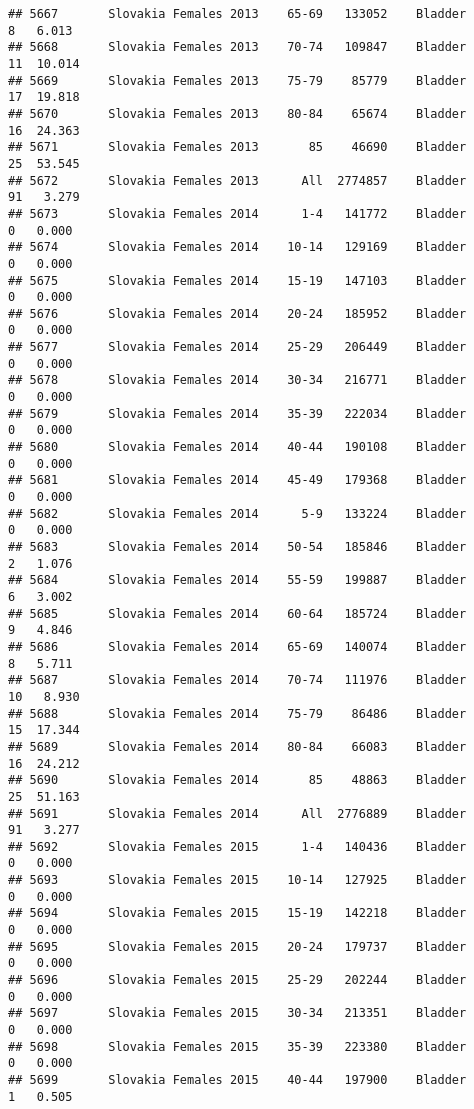 \documentclass[
]{article}
\begin{document}
\begin{verbatim}
## 5667       Slovakia Females 2013    65-69   133052    Bladder      8   6.013
## 5668       Slovakia Females 2013    70-74   109847    Bladder     11  10.014
## 5669       Slovakia Females 2013    75-79    85779    Bladder     17  19.818
## 5670       Slovakia Females 2013    80-84    65674    Bladder     16  24.363
## 5671       Slovakia Females 2013       85    46690    Bladder     25  53.545
## 5672       Slovakia Females 2013      All  2774857    Bladder     91   3.279
## 5673       Slovakia Females 2014      1-4   141772    Bladder      0   0.000
## 5674       Slovakia Females 2014    10-14   129169    Bladder      0   0.000
## 5675       Slovakia Females 2014    15-19   147103    Bladder      0   0.000
## 5676       Slovakia Females 2014    20-24   185952    Bladder      0   0.000
## 5677       Slovakia Females 2014    25-29   206449    Bladder      0   0.000
## 5678       Slovakia Females 2014    30-34   216771    Bladder      0   0.000
## 5679       Slovakia Females 2014    35-39   222034    Bladder      0   0.000
## 5680       Slovakia Females 2014    40-44   190108    Bladder      0   0.000
## 5681       Slovakia Females 2014    45-49   179368    Bladder      0   0.000
## 5682       Slovakia Females 2014      5-9   133224    Bladder      0   0.000
## 5683       Slovakia Females 2014    50-54   185846    Bladder      2   1.076
## 5684       Slovakia Females 2014    55-59   199887    Bladder      6   3.002
## 5685       Slovakia Females 2014    60-64   185724    Bladder      9   4.846
## 5686       Slovakia Females 2014    65-69   140074    Bladder      8   5.711
## 5687       Slovakia Females 2014    70-74   111976    Bladder     10   8.930
## 5688       Slovakia Females 2014    75-79    86486    Bladder     15  17.344
## 5689       Slovakia Females 2014    80-84    66083    Bladder     16  24.212
## 5690       Slovakia Females 2014       85    48863    Bladder     25  51.163
## 5691       Slovakia Females 2014      All  2776889    Bladder     91   3.277
## 5692       Slovakia Females 2015      1-4   140436    Bladder      0   0.000
## 5693       Slovakia Females 2015    10-14   127925    Bladder      0   0.000
## 5694       Slovakia Females 2015    15-19   142218    Bladder      0   0.000
## 5695       Slovakia Females 2015    20-24   179737    Bladder      0   0.000
## 5696       Slovakia Females 2015    25-29   202244    Bladder      0   0.000
## 5697       Slovakia Females 2015    30-34   213351    Bladder      0   0.000
## 5698       Slovakia Females 2015    35-39   223380    Bladder      0   0.000
## 5699       Slovakia Females 2015    40-44   197900    Bladder      1   0.505

\end{verbatim}
\end{document}
